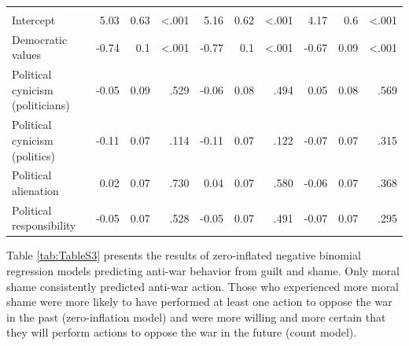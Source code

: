 \documentclass[
]{article}
\begin{document}
\begin{table}[H]
\begin{tabular}[t]{lrrrrrrrrr}
\midrule\\
Intercept & 5.03 & 0.63 & <.001 & 5.16 & 0.62 & <.001 & 4.17 & 0.6 & <.001\\
Democratic values & -0.74 & 0.1 & <.001 & -0.77 & 0.1 & <.001 & -0.67 & 0.09 & <.001\\
\addlinespace
Political cynicism (politicians) & -0.05 & 0.09 & .529 & -0.06 & 0.08 & .494 & 0.05 & 0.08 & .569\\
Political cynicism (politics) & -0.11 & 0.07 & .114 & -0.11 & 0.07 & .122 & -0.07 & 0.07 & .315\\
Political alienation & 0.02 & 0.07 & .730 & 0.04 & 0.07 & .580 & -0.06 & 0.07 & .368\\
Political responsibility & -0.05 & 0.07 & .528 & -0.05 & 0.07 & .491 & -0.07 & 0.07 & .295\\
\bottomrule
\end{tabular}
\end{table}

Table \ref{tab:TableS3} presents the results of zero-inflated negative binomial regression models predicting anti-war behavior from guilt and shame. Only moral shame consistently predicted anti-war action. Those who experienced more moral shame were more likely to have performed at least one action to oppose the war in the past (zero-inflation model) and were more willing and more certain that they will perform actions to oppose the war in the future (count model).
\end{document}
